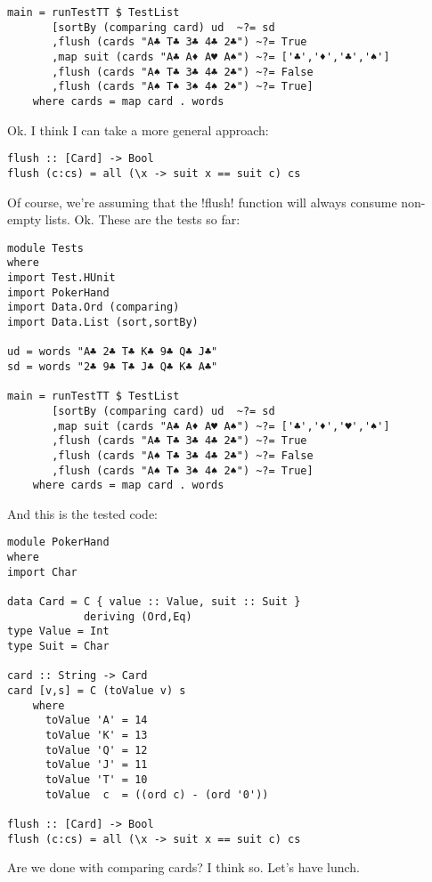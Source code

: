 \begin{lstlisting}[frame=single]
main = runTestTT $ TestList 
       [sortBy (comparing card) ud  ~?= sd
       ,flush (cards "A♣ T♣ 3♣ 4♣ 2♣") ~?= True
       ,map suit (cards "A♣ A♦ A♥ A♠") ~?= ['♣','♦','♣','♠']
       ,flush (cards "A♠ T♣ 3♣ 4♣ 2♣") ~?= False
       ,flush (cards "A♠ T♠ 3♠ 4♠ 2♠") ~?= True]
    where cards = map card . words
\end{lstlisting} %
\lhA \failure Ok. I think I can take a more general approach:
\begin{lstlisting}[frame=single]
flush :: [Card] -> Bool
flush (c:cs) = all (\x -> suit x == suit c) cs
\end{lstlisting}
\success Of course, we're assuming that the \il!flush! function will always consume non-empty lists. 
\lhN Ok. These are the tests so far:
\begin{lstlisting}[frame=single]
module Tests
where 
import Test.HUnit
import PokerHand
import Data.Ord (comparing)
import Data.List (sort,sortBy)

ud = words "A♣ 2♣ T♣ K♣ 9♣ Q♣ J♣"
sd = words "2♣ 9♣ T♣ J♣ Q♣ K♣ A♣"

main = runTestTT $ TestList 
       [sortBy (comparing card) ud  ~?= sd
       ,map suit (cards "A♣ A♦ A♥ A♠") ~?= ['♣','♦','♥','♠']
       ,flush (cards "A♣ T♣ 3♣ 4♣ 2♣") ~?= True
       ,flush (cards "A♠ T♣ 3♣ 4♣ 2♣") ~?= False
       ,flush (cards "A♠ T♠ 3♠ 4♠ 2♠") ~?= True]
    where cards = map card . words
\end{lstlisting} %
\lhA And this is the tested code:
\begin{lstlisting}[frame=single]
module PokerHand
where
import Char

data Card = C { value :: Value, suit :: Suit } 
            deriving (Ord,Eq)
type Value = Int
type Suit = Char

card :: String -> Card
card [v,s] = C (toValue v) s
    where 
      toValue 'A' = 14
      toValue 'K' = 13
      toValue 'Q' = 12
      toValue 'J' = 11
      toValue 'T' = 10
      toValue  c  = ((ord c) - (ord '0'))

flush :: [Card] -> Bool
flush (c:cs) = all (\x -> suit x == suit c) cs
\end{lstlisting}
\lhN Are we done with comparing cards?
\lhA I think so. Let's have lunch.
\lhend
